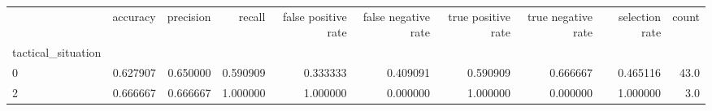 \begin{tabular}{lrrrrrrrrr}
\toprule
{} &  accuracy &  precision &    recall &  false positive rate &  false negative rate &  true positive rate &  true negative rate &  selection rate &  count \\
tactical\_situation &           &            &           &                      &                      &                     &                     &                 &        \\
\midrule
0                  &  0.627907 &   0.650000 &  0.590909 &             0.333333 &             0.409091 &            0.590909 &            0.666667 &        0.465116 &   43.0 \\
2                  &  0.666667 &   0.666667 &  1.000000 &             1.000000 &             0.000000 &            1.000000 &            0.000000 &        1.000000 &    3.0 \\
\bottomrule
\end{tabular}
